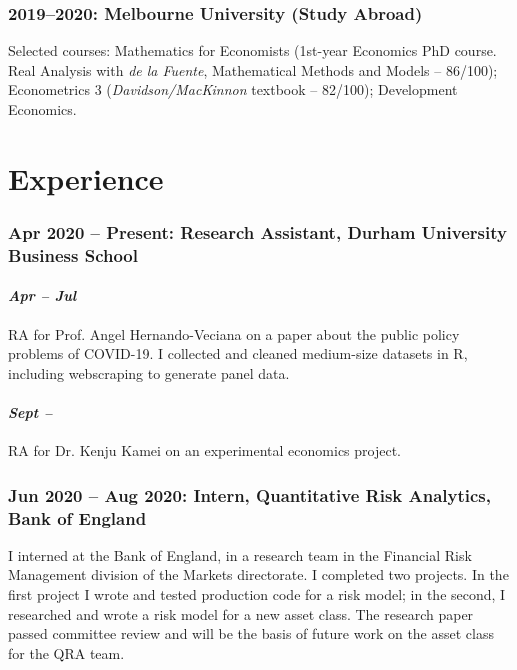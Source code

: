 \documentclass[a4]{article}
\begin{document}
\subsubsection*{2019--2020: Melbourne University (Study Abroad)}
Selected courses: Mathematics for Economists (1st-year Economics PhD course. Real Analysis with \textit{de la Fuente}, Mathematical Methods and Models  -- 86/100); Econometrics 3 (\textit{Davidson/MacKinnon} textbook -- 82/100);  Development Economics.
  

\section*{Experience}
\subsubsection*{Apr 2020 -- Present: Research Assistant, Durham University Business School}
\paragraph*{\textit{Apr -- Jul}} RA for Prof. Angel Hernando-Veciana on a paper about the public policy problems of COVID-19. I collected and cleaned medium-size datasets in R, including webscraping to generate panel data.%
\paragraph{\textit{Sept --}} RA for Dr. Kenju Kamei on an experimental economics project.

\subsubsection*{Jun 2020 -- Aug 2020: Intern, Quantitative Risk Analytics, Bank of England}
I interned at the Bank of England, in a research team in the Financial Risk Management division of the Markets directorate. I completed two projects. In the first project I wrote and tested production code for a risk model; in the second, I researched and wrote a risk model for a new asset class. The research paper passed committee review and will be the basis of future work on the asset class for the QRA team. 
\end{document}
